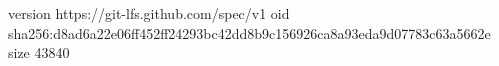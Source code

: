 version https://git-lfs.github.com/spec/v1
oid sha256:d8ad6a22e06ff452ff24293bc42dd8b9c156926ca8a93eda9d07783c63a5662e
size 43840
